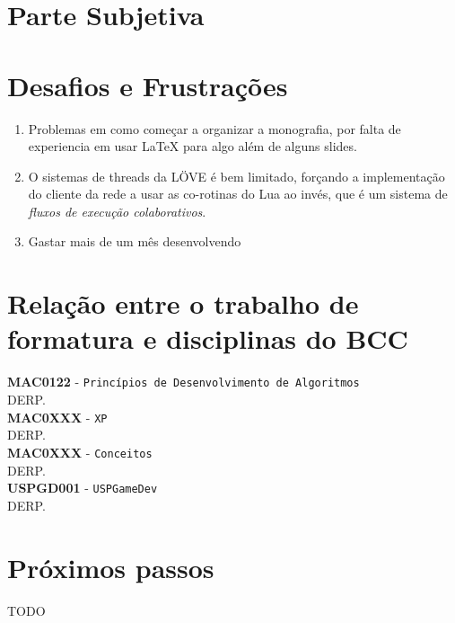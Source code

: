 \chapter*{Parte Subjetiva}
\label{sec:parte_subjetiva}

\chapter{Desafios e Frustrações}
\label{sec:desafios_frustracoes}

    \begin{enumerate}
        \item Problemas em como começar a organizar a monografia, por falta de experiencia em
            usar LaTeX para algo além de alguns slides.
            
        \item O sistemas de threads da LÖVE é bem limitado, forçando a implementação do cliente da rede a usar
            as co-rotinas do Lua ao invés, que é um sistema de \textit{fluxos de execução colaborativos}.
            
        \item Gastar mais de um mês desenvolvendo 
    \end{enumerate}

\chapter{Relação entre o trabalho de formatura e disciplinas do BCC}
\label{sec:relacao_disciplinas_bcc}
\newcommand\materia[3]{\noindent \textbf{#1} - \texttt{#2}\\\indent #3\vspace{0.5cm}\\}

\materia{MAC0122}{Princípios de Desenvolvimento de Algoritmos}{
    DERP.
}
\materia{MAC0XXX}{XP}{
    DERP.
}
\materia{MAC0XXX}{Conceitos}{
    DERP.
}

\materia{USPGD001}{USPGameDev}{
    DERP.
}

\chapter{Próximos passos}
\label{sec:proximos_passos}

TODO
